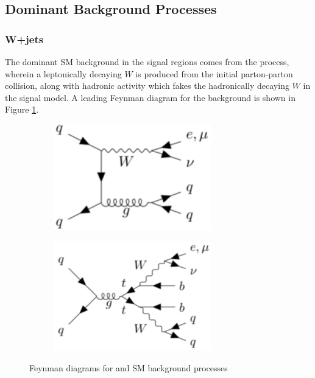 \subsection{Dominant Background Processes}
\label{sec:dominant_bkgs}

\subsubsection{W+jets}
\label{sec:wjets_description}

The dominant SM background in the signal regions comes from the \wjets process, wherein a leptonically decaying \(W\) is produced from the initial parton-parton collision, along with hadronic activity which fakes the hadronically decaying \(W\) in the signal model. A leading Feynman diagram for the \wjets background is shown in Figure \ref{fig:Wjets_Feynman}.

\begin{figure}[h]
  \centering
     \begin{subfigure}{0.49\textwidth}
     \includegraphics[width = 0.75\textwidth]{Figures/4/Fey_Wjets.pdf}
    \caption{\wjets}
    \label{fig:Wjets_Feynman}
     \end{subfigure}
    \begin{subfigure}{0.49\textwidth}
     \includegraphics[width = 0.75\textwidth]{Figures/4/Fey_ttbar.pdf}
     \caption{\ttbar}
     \label{fig:ttbar_Feynman}
     \end{subfigure}
     \caption{Feynman diagrams for \wjets and \ttbar SM background processes}
     \label{fig:Feynman_bkgs}
  \end{figure}
  
